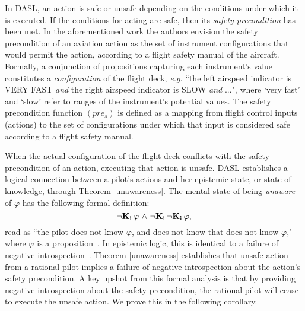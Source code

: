 In DASL, an action is safe or unsafe depending on the conditions under which it is executed. If the conditions for acting are safe, then its \emph{safety precondition} has been met. In the aforementioned work the authors envision the safety precondition of an aviation action as the set of instrument configurations that would permit the action, according to a flight safety manual of the aircraft. Formally, a conjunction of propositions capturing each instrument's value constitutes a \emph{configuration} of the flight deck, \emph{e.g.} ``the left airspeed indicator is VERY FAST \emph{and} the right airspeed indicator is SLOW \emph{and} ...", where `very fast' and `slow' refer to ranges of the instrument's potential values. The safety precondition function $(pre_s)$ is defined as a mapping from flight control inputs (actions) to the set of configurations under which that input is considered safe according to a flight safety manual.


When the actual configuration of the flight deck conflicts with the safety precondition of an action, executing that action is unsafe. DASL establishes a logical connection between a pilot's actions and her epistemic state, or state of knowledge, through Theorem \ref{unawareness}. The mental state of being \emph{unaware} of $\varphi$ has the following formal definition:
\begin{equation*}
\label{formal_unawareness}
{\neg} \mathbf{K}_{\mathbf{i}}\, \varphi {\ \wedge \ } {\neg} \mathbf{K}_{\mathbf{i}}\, {\neg} \mathbf{K}_{\mathbf{i}}\, \varphi,
\end{equation*}
read as ``the pilot  does not know $\varphi$, and  does not know that  does not know $\varphi$," where $\varphi$ is a proposition~\cite{unawareness}. In epistemic logic, this is identical to a failure of negative introspection~\cite{Hintikka,FHMV}. Theorem \ref{unawareness} establishes that unsafe action from a rational pilot implies a failure of negative introspection about the action's safety precondition. A key upshot from this formal analysis is that by providing negative introspection about the safety precondition, the rational pilot will cease to execute the unsafe action. We prove this in the following corollary.

%
%	    

